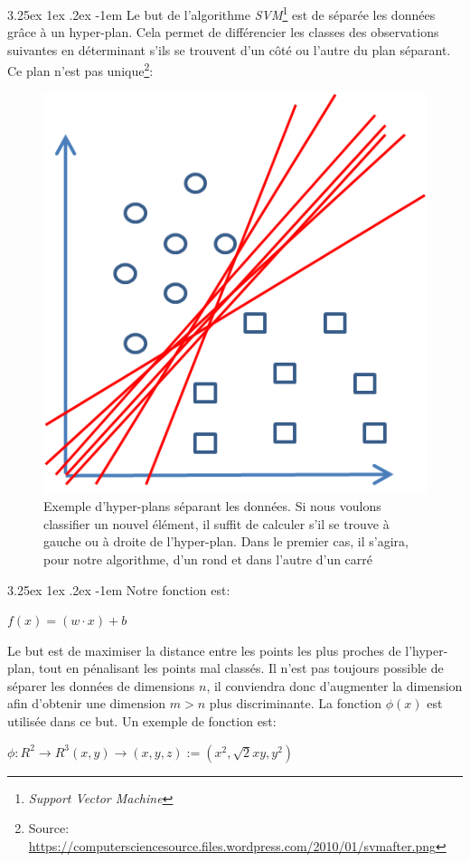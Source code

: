 \documentclass[a4paper, 11pt]{article}
\makeatletter
\renewcommand\paragraph{\@startsection{paragraph}{5}{\z@}%
  {3.25ex \@plus1ex \@minus.2ex}%
  {-1em}%
  {\normalfont\normalsize\bfseries}}
\makeatother
\begin{document}
\paragraph{}
Le but de l'algorithme \textit{SVM}\footnote{\textit{Support Vector Machine}} est de séparée les données grâce à un hyper-plan. Cela permet de différencier les classes des observations suivantes en déterminant s'ils se trouvent d'un côté ou l'autre du plan séparant. Ce plan n'est pas unique\footnote{Source: \url{https://computersciencesource.files.wordpress.com/2010/01/svmafter.png}}: 
\begin{figure}[H]
\centering
\includegraphics{images/svm_exemple}
\caption{Exemple d'hyper-plans séparant les données. Si nous voulons classifier un nouvel élément, il suffit de calculer s'il se trouve à gauche ou à droite de l'hyper-plan. Dans le premier cas, il s'agira, pour notre algorithme, d'un rond et dans l'autre d'un carré}
\end{figure}

\paragraph{}
Notre fonction est:
\begin{center}
$f(x) = (w \cdot x) + b$
\end{center}
Le but est de maximiser la distance entre les points les plus proches de l'hyper-plan, tout en pénalisant les points mal classés. Il n'est pas toujours possible de séparer les données de dimensions $n$, il conviendra donc d'augmenter la dimension afin d'obtenir une dimension $m > n$ plus discriminante. La fonction $\phi(x)$ est utilisée dans ce but. Un exemple de fonction est:
\begin{center}
$\phi: R^2 \rightarrow R^3 (x, y) \rightarrow (x, y, z):= (x^2, \sqrt{2}x y, y^2)$
\end{center}
\end{document}
